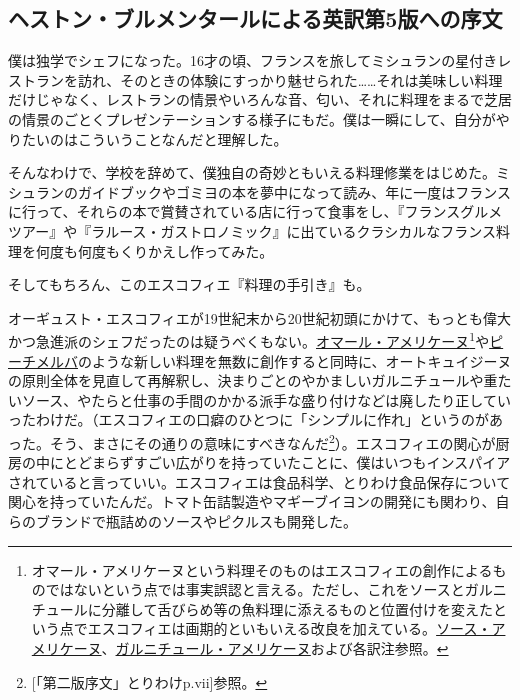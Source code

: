 \frontmatter

\setlength{\parindent}{1\zw}

\vspace*{4\zw}

\begin{main}

\hypertarget{preface-heston-blumenthal}{%
\section{ヘストン・ブルメンタールによる英訳第5版への序文}\label{preface-heston-blumenthal}}

\vspace{2\zw}
\thispagestyle{empty}

僕は独学でシェフになった。16才の頃、フランスを旅してミシュランの星付きレストランを訪れ、そのときの体験にすっかり魅せられた\ldots{}\ldots{}それは美味しい料理だけじゃなく、レストランの情景やいろんな音、匂い、それに料理をまるで芝居の情景のごとくプレゼンテーションする様子にもだ。僕は一瞬にして、自分がやりたいのはこういうことなんだと理解した。

そんなわけで、学校を辞めて、僕独自の奇妙ともいえる料理修業をはじめた。ミシュランのガイドブックやゴミヨの本を夢中になって読み、年に一度はフランスに行って、それらの本で賞賛されている店に行って食事をし、『フランスグルメツアー』や『ラルース・ガストロノミック』に出ているクラシカルなフランス料理を何度も何度もくりかえし作ってみた。

そしてもちろん、このエスコフィエ『料理の手引き』も。

オーギュスト・エスコフィエが19世紀末から20世紀初頭にかけて、もっとも偉大かつ急進派のシェフだったのは疑うべくもない。\protect\hyperlink{homard-americaine}{オマール・アメリケーヌ}\footnote{オマール・アメリケーヌという料理そのものはエスコフィエの創作によるものではないという点では事実誤認と言える。ただし、これをソースとガルニチュールに分離して舌びらめ等の魚料理に添えるものと位置付けを変えたという点でエスコフィエは画期的といもいえる改良を加えている。\protect\hyperlink{sauce-americaine}{ソース・アメリケーヌ}、\protect\hyperlink{garniture-americaine}{ガルニチュール・アメリケーヌ}および各訳注参照。}や\protect\hyperlink{peches-melba}{ピーチメルバ}のような新しい料理を無数に創作すると同時に、オートキュイジーヌの原則全体を見直して再解釈し、決まりごとのやかましいガルニチュールや重たいソース、やたらと仕事の手間のかかる派手な盛り付けなどは廃したり正していったわけだ。（エスコフィエの口癖のひとつに「シンプルに作れ」というのがあった。そう、まさにその通りの意味にすべきなんだ\footnote{{[}「第二版序文」とりわけp.vii{]}参照。}）。エスコフィエの関心が厨房の中にとどまらずすごい広がりを持っていたことに、僕はいつもインスパイアされていると言っていい。エスコフィエは食品科学、とりわけ食品保存について関心を持っていたんだ。トマト缶詰製造やマギーブイヨンの開発にも関わり、自らのブランドで瓶詰めのソースやピクルスも開発した。


\end{main}
